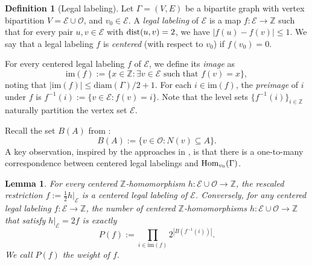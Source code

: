 \documentclass{amsart}
\newtheorem{lem}[thm]{Lemma}
\theoremstyle{definition}
\newtheorem{mydef}[thm]{Definition}
\newcommand{\cO}{\mathcal{O} }
\newcommand{\cE}{\mathcal{E} }
\newcommand{\beq}[1]{\begin{equation}\label{#1}}
\newcommand{\enq}[0]{\end{equation}}
\newcommand{\0}[0]{\emptyset}
\newcommand{\Hom}[0]{\mbox{\rm{Hom}}}
\newcommand{\dist}[0]{\mbox{\rm{dist}}}
\begin{document}
\begin{mydef}[Legal labeling]\label{def:legal-labeling}
Let $\Gamma=(V, E)$ be a bipartite graph with vertex bipartition $V=\cE\cup\cO$, and $v_0 \in \cE$.
A \textit{legal labeling} of $\cE$ is a map $f:\cE\to \mathbb{Z}$ such that for every pair $u,v\in \cE$ with $\dist(u,v)=2$, we have $|f(u)-f(v)|\leq 1$. We say that a legal labeling $f$ is \textit{centered} (with respect to $v_0$) if $f(v_0)=0$.
\end{mydef}

For every centered legal labeling $f$ of $\cE$, we define its \textit{image} as 
\[
\mathrm{im}(f):=\{x \in \mathbb{Z} : \exists v \in \cE \text{ such that } f(v)=x\},
\]
noting that $|\mathrm{im}(f)|\le \mathrm{diam}(\Gamma)/2+1$. For each $i\in\mathrm{im}(f)$, the \textit{preimage} of $i$ under $f$ is $f^{-1}(i):=\{v\in \cE:f(v)=i\}$. Note that the level sets $\{f^{-1}(i)\}_{i \in \mathbb{Z}}$ naturally partition the vertex set $\cE$.

Recall the set $B(A)$ from :%
\[ B(A) := \{v \in \cO : N(v) \subseteq A\}. \]
A key observation, inspired by the approaches in \cite{galvin2003homomorphisms, peled2013lipschitz}, is that there is a one-to-many correspondence between centered legal labelings and $\Hom_{v_0}(\Gamma)$. 

\begin{lem}\label{obs:centered}
For every centered $\mathbb{Z}$-homomorphism $h:\cE\cup \cO \to \mathbb{Z}$, the rescaled restriction $f := \frac{1}{2}h|_{\cE}$ is a centered legal labeling of $\cE$. Conversely, for any centered legal labeling $f:\cE\to\mathbb{Z}$, the number of centered $\mathbb{Z}$-homomorphisms $h:\cE\cup \cO\to \mathbb{Z}$ that satisfy $h|_{\cE}=2f$ is exactly
\beq{def:P(f)}
P(f):=\prod_{i\in\mathrm{im}(f)}2^{|B(f^{-1}(i))|}.
\enq
We call $P(f)$ the \emph{weight} of $f$.
\end{lem}
\end{document}
